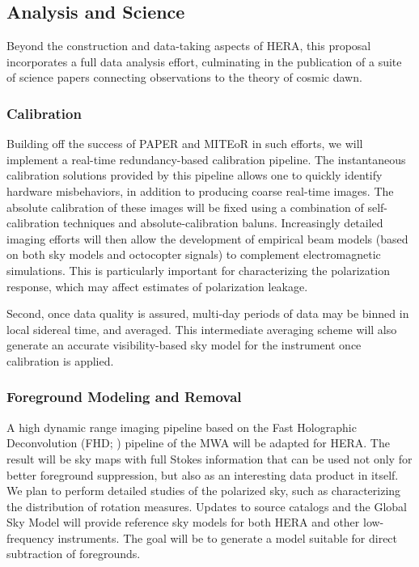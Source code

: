 \documentclass[preprint]{aastex}
\begin{document}
\subsection{Analysis and Science}

Beyond the construction and data-taking aspects of HERA, this proposal incorporates a full data analysis effort, culminating in the publication of a suite of science papers connecting observations to the theory of cosmic dawn.

\subsubsection{Calibration}

Building off the success of PAPER and MITEoR in such efforts, we will implement a real-time redundancy-based calibration pipeline.  The instantaneous calibration solutions provided by this pipeline allows one to quickly identify hardware misbehaviors, in addition to producing coarse real-time images.  The absolute calibration of these images will be fixed using a combination of self-calibration techniques and absolute-calibration baluns.  Increasingly detailed imaging efforts will then allow the development of empirical beam models (based on both sky models and octocopter signals) to complement electromagnetic simulations.  This is particularly important for characterizing the polarization response, which may affect estimates of polarization leakage.

Second, once data quality is assured, multi-day periods of data may be
binned in local sidereal time, and averaged. This intermediate
averaging scheme will also generate an accurate visibility-based sky
model for the instrument once calibration is applied.

\subsubsection{Foreground Modeling and Removal}
\label{sec:DataProducts}

A high dynamic range imaging pipeline based on the Fast Holographic Deconvolution (FHD; \citealt{sullivan_et_al2012}) pipeline of the MWA will be adapted for HERA.  The result will be sky maps with full Stokes information that can be used not only for better foreground suppression, but also as an interesting data product in itself.  We plan to perform detailed studies of the polarized sky, such as characterizing the distribution of rotation measures.  Updates to source catalogs and the Global Sky Model \citep{deoliveira2008} will provide reference sky models for both HERA and other low-frequency instruments. The goal will be to generate a model suitable for direct subtraction of foregrounds. 
\end{document}
